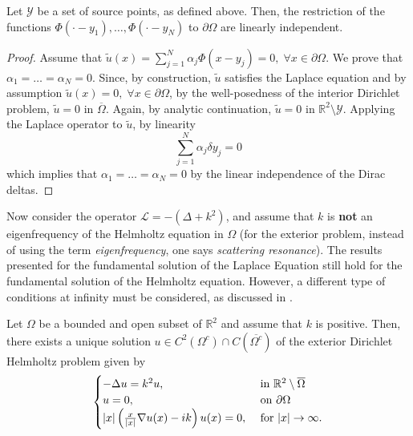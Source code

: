 \begin{theorem}\label{lapl_li}
    Let \(\mathcal{Y}\) be a set of source points, as defined above. Then, the restriction of the functions \(\Phi(\cdot-y_1),\dots,\Phi(\cdot-y_N)\) to \(\partial\Omega\) are linearly independent.
\end{theorem}
\begin{proof}
    Assume that \(\tilde{u}(x) = \sum_{j=1}^{N}\alpha_j \Phi(x-y_j) = 0, \; \forall x \in \partial\Omega\). We prove that \(\alpha_1=\dots=\alpha_N = 0\). Since, by construction, \(\tilde{u}\) satisfies the Laplace equation and by assumption \(\tilde{u}(x) = 0, \; \forall x \in \partial\Omega\), by the well-posedness of the interior Dirichlet problem, \(\tilde{u} = 0\) in \(\overline{\Omega}\). Again, by analytic continuation, \(\tilde{u} = 0\) in \(\mathbb{R}^2\setminus\mathcal{Y}\). Applying the Laplace operator to \(\tilde{u}\), by linearity
    \[
        \sum_{j=1}^{N}\alpha_j \delta{y_j} = 0
    \]
    which implies that \(\alpha_1=\dots=\alpha_N = 0\) by the linear independence of the Dirac deltas.
\end{proof}

Now consider the operator \(\mathcal{L} = -(\Delta + k^2)\), and assume that \(k\) is \textbf{not} an eigenfrequency of the Helmholtz equation in \(\Omega\) (for the exterior problem, instead of using the term \textit{eigenfrequency}, one says \textit{scattering resonance}). The results presented for the fundamental solution of the Laplace Equation still hold for the fundamental solution of the Helmholtz equation. However, a different type of conditions at infinity must be considered, as discussed in \cite{colton2013integral}.

\begin{theorem}
    Let \(\Omega\) be a bounded and open subset of \(\mathbb{R}^2\) and assume that \(k\) is positive. Then, there exists a unique solution \(u \in C^2(\Omega^c) \cap C(\overline{\Omega^c})\) of the exterior Dirichlet Helmholtz problem given by
    \[
        \begin{cases}
            -\Delta u = k^2 u, & \text{ in }  \mathbb{R}^2\setminus \overline{\Omega}\\
            u = 0, & \text{ on }  \partial \Omega\\
            \abs{x} \left(\frac{x}{\abs{x}}\nabla u(x) - i k\right)u(x) = 0, & \text{ for }  \abs{x} \rightarrow \infty.
        \end{cases}
    \]
\end{theorem}

